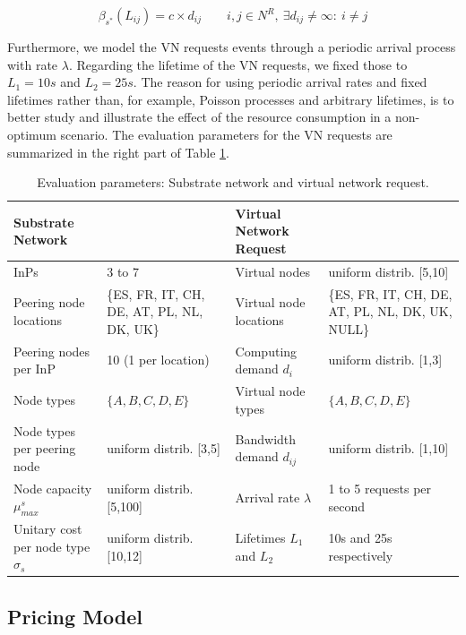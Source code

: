   \begin{equation} \label{eq:ev_linkCosts}
	\beta_{s^{*}}(L_{ij}) = c \times d_{ij} \qquad i,j \in N^R, \ \exists d_{ij} \neq \infty : \ i \neq j
  \end{equation}

Furthermore, we model the VN requests events through a periodic arrival process with rate $\lambda$. Regarding the lifetime of the VN requests, we fixed those to $L_1 = 10s$ and $L_2 = 25s$. The reason for using periodic arrival rates and fixed lifetimes rather than, for example, Poisson processes and arbitrary lifetimes, is to better study and illustrate the effect of the resource consumption in a non-optimum scenario. The evaluation parameters for the VN requests are summarized in the right part of Table \ref{tab:evparams}.

\begin{table}[bth]
	\myfloatalign \footnotesize
	\begin{tabularx}{\textwidth}{p{4.5cm}p{3.5cm}|p{4cm}p{4cm}}
	 	\textbf{Substrate Network} && \textbf{Virtual Network Request} \\
		\hline
		InPs & 3 to 7 & Virtual nodes & uniform distrib. [5,10] \\
		Peering node locations & \{ES, FR, IT, CH, DE, AT, PL, NL, DK, UK\} & Virtual node locations & \{ES, FR, IT, CH, DE, AT, PL, NL, DK, UK, NULL\}  \\
		Peering nodes per InP & 10 (1 per location) & Computing demand $d_i$ & uniform distrib. [1,3] \\
		Node types & $\{A, B, C, D, E\}$ & Virtual node types & $\{A, B, C, D, E\}$ \\
		Node types per peering node & uniform distrib. [3,5]  & Bandwidth demand $d_{ij}$ & uniform distrib. [1,10] \\
		Node capacity $\mu^{s}_{max}$ & uniform distrib. [5,100] & Arrival rate $\lambda$ & 1 to 5 requests per second \\
		Unitary cost per node type $\sigma_s$ & uniform distrib. [10,12] & Lifetimes $L_1$ and $L_2$ & 10s and 25s respectively
	\end{tabularx}
	\caption{Evaluation parameters: Substrate network and virtual network request.}
	\label{tab:evparams}
\end{table} 

\subsection{Pricing Model} \label{pricing model}


